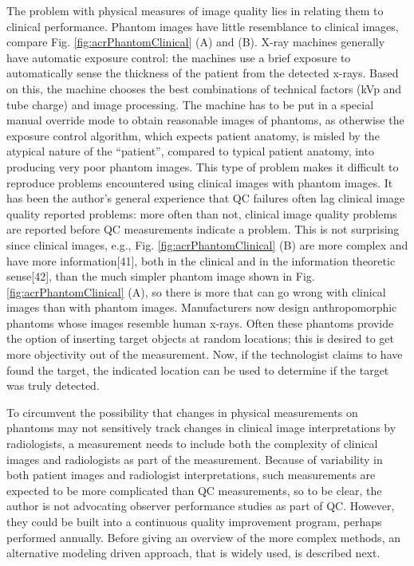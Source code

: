 \documentclass[
]{book}
\begin{document}
The problem with physical measures of image quality lies in relating them to clinical performance. Phantom images have little resemblance to clinical images, compare Fig. \ref{fig:acrPhantomClinical} (A) and (B). X-ray machines generally have automatic exposure control: the machines use a brief exposure to automatically sense the thickness of the patient from the detected x-rays. Based on this, the machine chooses the best combinations of technical factors (kVp and tube charge) and image processing. The machine has to be put in a special manual override mode to obtain reasonable images of phantoms, as otherwise the exposure control algorithm, which expects patient anatomy, is misled by the atypical nature of the ``patient'', compared to typical patient anatomy, into producing very poor phantom images. This type of problem makes it difficult to reproduce problems encountered using clinical images with phantom images. It has been the author's general experience that QC failures often lag clinical image quality reported problems: more often than not, clinical image quality problems are reported before QC measurements indicate a problem. This is not surprising since clinical images, e.g., Fig. \ref{fig:acrPhantomClinical} (B) are more complex and have more information{[}41{]}, both in the clinical and in the information theoretic sense{[}42{]}, than the much simpler phantom image shown in Fig. \ref{fig:acrPhantomClinical} (A), so there is more that can go wrong with clinical images than with phantom images. Manufacturers now design anthropomorphic phantoms whose images resemble human x-rays. Often these phantoms provide the option of inserting target objects at random locations; this is desired to get more objectivity out of the measurement. Now, if the technologist claims to have found the target, the indicated location can be used to determine if the target was truly detected.

To circumvent the possibility that changes in physical measurements on phantoms may not sensitively track changes in clinical image interpretations by radiologists, a measurement needs to include both the complexity of clinical images and radiologists as part of the measurement. Because of variability in both patient images and radiologist interpretations, such measurements are expected to be more complicated than QC measurements, so to be clear, the author is not advocating observer performance studies as part of QC. However, they could be built into a continuous quality improvement program, perhaps performed annually. Before giving an overview of the more complex methods, an alternative modeling driven approach, that is widely used, is described next.
\end{document}
